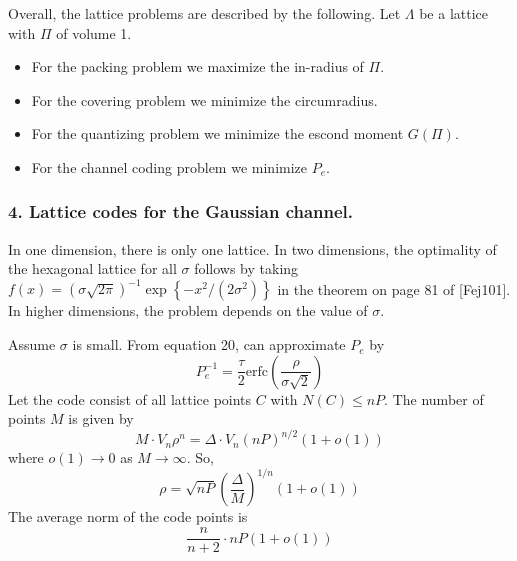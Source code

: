 \documentclass{article}
\renewcommand{\i}{^{-1}}
\newcommand{\ra}{\rightarrow}
\newcommand{\ass}[1]{\left( #1 \right)}
\newcommand{\set}[1]{\left\{ #1 \right\}}
\begin{document}
Overall, the lattice problems are described by the following.
Let $\Lambda$ be a lattice with $\Pi$ of volume 1.
\begin{itemize}
  \item For the packing problem we maximize the in-radius of $\Pi$.
  \item For the covering problem we minimize the circumradius.
  \item For the quantizing problem we minimize the escond moment $G(\Pi)$.
  \item For the channel coding problem we minimize $P_e$.
\end{itemize}

\subsubsection*{4. Lattice codes for the Gaussian channel.}

In one dimension, there is only one lattice.
In two dimensions, the optimality of the hexagonal lattice for all $\sigma$ follows by taking $f(x) = (\sigma \sqrt{2\pi})\i \exp\set{-x^2/(2\sigma^2)}$ in the theorem on page 81 of [Fej101].
In higher dimensions, the problem depends on the value of $\sigma$.

Assume $\sigma$ is small.
From equation 20, can approximate $P_e$ by
$$ P_e\i = \frac{\tau}{2} \text{erfc} \ass{\frac{\rho}{\sigma\sqrt 2}} $$
Let the code consist of all lattice points $C$ with $N(C) \leq nP$.
The number of points $M$ is given by
$$ M \cdot V_n \rho^n = \Delta \cdot V_n (nP)^{n/2} (1 + o(1)) $$
where $o(1) \ra 0$ as $M \ra \infty$.
So,
$$ \rho = \sqrt{nP} \ass{\frac{\Delta}{M}}^{1/n} (1 + o(1)) $$
The average norm of the code points is
$$ \frac{n}{n+2} \cdot n P (1 + o(1)) $$

\end{document}
